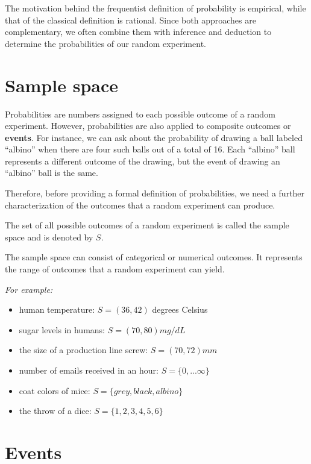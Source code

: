 \documentclass[
]{book}
\providecommand{\tightlist}{%
  \setlength{\itemsep}{0pt}\setlength{\parskip}{0pt}}
\begin{document}
The motivation behind the frequentist definition of probability is empirical, while that of the classical definition is rational. Since both approaches are complementary, we often combine them with inference and deduction to determine the probabilities of our random experiment.

\hypertarget{sample-space}{%
\section{Sample space}\label{sample-space}}

Probabilities are numbers assigned to each possible outcome of a random experiment. However, probabilities are also applied to composite outcomes or \textbf{events}. For instance, we can ask about the probability of drawing a ball labeled ``albino'' when there are four such balls out of a total of 16. Each ``albino'' ball represents a different outcome of the drawing, but the event of drawing an ``albino'' ball is the same.

Therefore, before providing a formal definition of probabilities, we need a further characterization of the outcomes that a random experiment can produce.

The set of all possible outcomes of a random experiment is called the sample space and is denoted by \(S\).

The sample space can consist of categorical or numerical outcomes. It represents the range of outcomes that a random experiment can yield.

\emph{For example:}

\begin{itemize}
\tightlist
\item
  human temperature: \(S = (36, 42)\) degrees Celsius
\item
  sugar levels in humans: \(S =( 70,80) mg/ dL\)
\item
  the size of a production line screw: \(S =(70,72) mm\)
\item
  number of emails received in an hour: \(S = \{0, ...\infty \}\)
\item
  coat colors of mice: \(S= \{grey, black, albino\}\)
\item
  the throw of a dice: \(S= \{ 1, 2, 3, 4, 5, 6\}\)
\end{itemize}

\hypertarget{events}{%
\section{Events}\label{events}}
\end{document}
